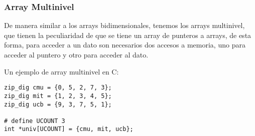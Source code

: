 \subsubsection{Array Multinivel}
De manera similar a los arrays bidimensionales, tenemos los arrays multinivel, que tienen la peculiaridad de que 
se tiene un array de punteros a arrays, de esta forma, para acceder a un dato son necesarios dos accesos a memoria, uno para acceder al puntero y otro para acceder al dato.
\begin{ejemplo}
    Un ejemplo de array multinivel en C: 
    \begin{center}
        \begin{verbatim}
zip_dig cmu = {0, 5, 2, 7, 3};
zip_dig mit = {1, 2, 3, 4, 5};
zip_dig ucb = {9, 3, 7, 5, 1};

# define UCOUNT 3
int *univ[UCOUNT] = {cmu, mit, ucb};
        \end{verbatim}
    \end{center}
\end{ejemplo}
